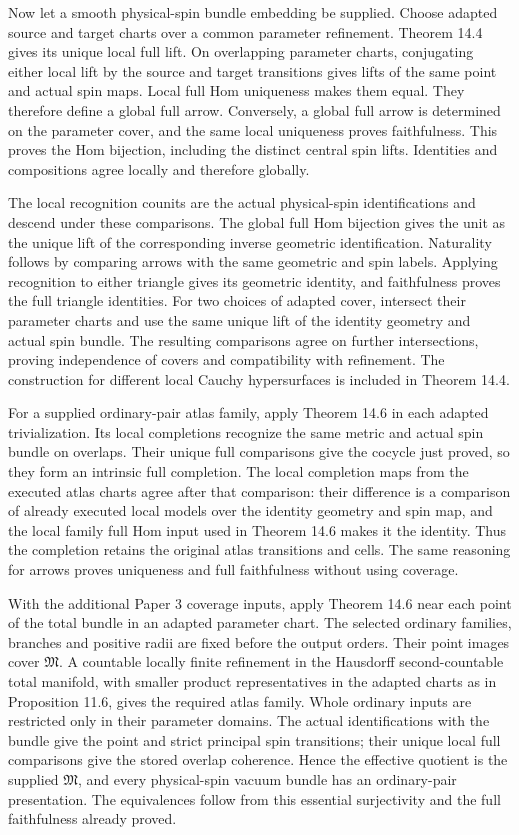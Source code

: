 \documentclass[
  english,
  11pt,
  reqno]{amsart}
\begin{document}
Now let a smooth physical-spin bundle embedding be supplied. Choose
adapted source and target charts over a common parameter refinement.
Theorem 14.4 gives its unique local full lift. On overlapping parameter
charts, conjugating either local lift by the source and target
transitions gives lifts of the same point and actual spin maps. Local
full Hom uniqueness makes them equal. They therefore define a global
full arrow. Conversely, a global full arrow is determined on the
parameter cover, and the same local uniqueness proves faithfulness. This
proves the Hom bijection, including the distinct central spin lifts.
Identities and compositions agree locally and therefore globally.

The local recognition counits are the actual physical-spin
identifications and descend under these comparisons. The global full Hom
bijection gives the unit as the unique lift of the corresponding inverse
geometric identification. Naturality follows by comparing arrows with
the same geometric and spin labels. Applying recognition to either
triangle gives its geometric identity, and faithfulness proves the full
triangle identities. For two choices of adapted cover, intersect their
parameter charts and use the same unique lift of the identity geometry
and actual spin bundle. The resulting comparisons agree on further
intersections, proving independence of covers and compatibility with
refinement. The construction for different local Cauchy hypersurfaces is
included in Theorem 14.4.

For a supplied ordinary-pair atlas family, apply Theorem 14.6 in each
adapted trivialization. Its local completions recognize the same metric
and actual spin bundle on overlaps. Their unique full comparisons give
the cocycle just proved, so they form an intrinsic full completion. The
local completion maps from the executed atlas charts agree after that
comparison: their difference is a comparison of already executed local
models over the identity geometry and spin map, and the local family
full Hom input used in Theorem 14.6 makes it the identity. Thus the
completion retains the original atlas transitions and cells. The same
reasoning for arrows proves uniqueness and full faithfulness without
using coverage.

With the additional Paper 3 coverage inputs, apply Theorem 14.6 near
each point of the total bundle in an adapted parameter chart. The
selected ordinary families, branches and positive radii are fixed before
the output orders. Their point images cover \(\mathfrak M\). A countable
locally finite refinement in the Hausdorff second-countable total
manifold, with smaller product representatives in the adapted charts as
in Proposition 11.6, gives the required atlas family. Whole ordinary
inputs are restricted only in their parameter domains. The actual
identifications with the bundle give the point and strict principal spin
transitions; their unique local full comparisons give the stored overlap
coherence. Hence the effective quotient is the supplied \(\mathfrak M\),
and every physical-spin vacuum bundle has an ordinary-pair presentation.
The equivalences follow from this essential surjectivity and the full
faithfulness already proved.
\end{document}
